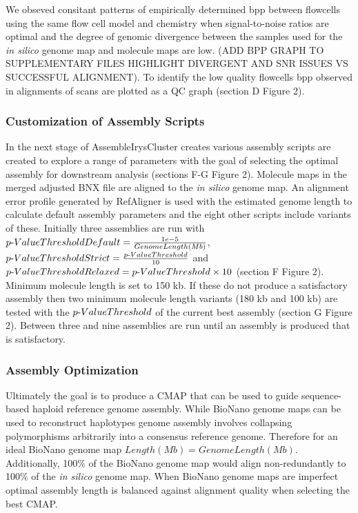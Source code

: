 \documentclass{bmcart}
\begin{document}
We obseved consitant patterns of empirically determined bpp between flowcells using the same flow cell model and chemistry when signal-to-noise ratios are optimal and the degree of genomic divergence between the samples used for the \textit{in silico} genome map and molecule maps are low. (ADD BPP GRAPH TO SUPPLEMENTARY FILES HIGHLIGHT DIVERGENT AND SNR ISSUES VS SUCCESSFUL ALIGNMENT). To identify the low quality flowcells bpp observed in alignments of scans are plotted as a QC graph (section D Figure 2). 

\subsubsection*{Customization of Assembly Scripts}

In the next stage of AssembleIrysCluster creates various assembly scripts are created to explore a range of parameters with the goal of selecting the optimal assembly for downstream analysis (sections F-G Figure 2). Molecule maps in the merged adjusted BNX file are aligned to the \textit{in silico} genome map. An alignment error profile generated by RefAligner is used with the estimated genome length to calculate default assembly parameters and the eight other scripts include variants of these. Initially three assemblies are run with $p\textnormal{-}Value Threshold Default = \frac{1e-5}{Genome Length (Mb)}$, $p\textnormal{-}Value Threshold Strict = \frac{p\textnormal{-}Value Threshold}{10}$ and $p\textnormal{-}Value Threshold Relaxed = {p\textnormal{-}Value Threshold} \times {10}$ (section F Figure 2). Minimum molecule length is set to 150 kb. If these do not produce a satisfactory assembly then two minimum molecule length variants (180 kb and 100 kb) are tested with the $p\textnormal{-}Value Threshold$ of the current best assembly (section G Figure 2). Between three and nine assemblies are run until an assembly is produced that is satisfactory.

\subsubsection*{Assembly Optimization}

Ultimately the goal is to produce a CMAP that can be used to guide sequence-based haploid reference genome assembly. While BioNano genome maps can be used to reconstruct haplotypes \cite{MHCLam} genome assembly involves collapsing polymorphisms arbitrarily into a consensus reference genome. Therefore for an ideal BioNano genome map $Length (Mb) = Genome Length (Mb)$. Additionally, 100\% of the BioNano genome map would align non-redundantly to 100\% of the \textit{in silico} genome map. When BioNano genome maps are imperfect optimal assembly length is balanced against alignment quality when selecting the best CMAP.
\end{document}
